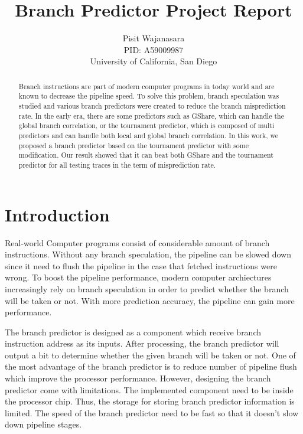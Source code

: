 \documentclass[conference]{IEEEtran}
\title{Branch Predictor Project Report}
\author{Pisit Wajanasara\\
PID: A59009987\\
University of California, San Diego}
\begin{document}
\maketitle
\thispagestyle{firstpage}
\pagestyle{plain}




\begin{abstract}

Branch instructions are part of modern computer programs in today world and are known to decrease
the pipeline speed. To solve this problem, branch speculation was studied and various branch predictors
were created to reduce the branch misprediction rate. In the early era, there are some predictors such as
GShare, which can handle the global branch correlation, or the tournament predictor, which is composed
of multi predictors and can handle both local and global branch correlation. In this work, we proposed
a branch predictor based on the tournament predictor with some modification. Our result showed that
it can beat both GShare and the tournament predictor for all testing traces in the term of misprediction rate.

\end{abstract}

\section{Introduction}

Real-world Computer programs consist of considerable amount of branch instructions. Without any branch speculation,
the pipeline can be slowed down since it need to flush the pipeline in the case that fetched instructions were wrong.
To boost the pipeline performance, modern computer archiectures increasingly rely on branch speculation in order
to predict whether the branch will be taken or not. With more prediction accuracy, the pipeline can gain more performance.

The branch predictor is designed as a component which receive branch instruction address as its inputs. After processing,
the branch predictor will output a bit to determine whether the given branch will be taken or not. One of the most
advantage of the branch predictor is to reduce number of pipeline flush which improve the processor performance. However,
designing the branch predictor come with limitations. The implemented component need to be inside the processor chip.
Thus, the storage for storing branch predictor information is limited. The speed of the branch predictor need to be fast
so that it doesn't slow down pipeline stages.
\end{document}
